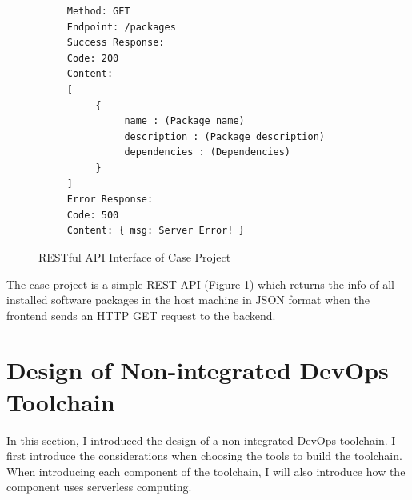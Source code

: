 \begin{figure}[!h]
     \begin{verbatim}
     Method: GET
     Endpoint: /packages
     Success Response:
     Code: 200
     Content:
     [
          {
               name : (Package name)
               description : (Package description)
               dependencies : (Dependencies)
          }
     ]
     Error Response:
     Code: 500
     Content: { msg: Server Error! }
     \end{verbatim}
     \caption{RESTful API Interface of Case Project}
     \label{fig:rest}
     \end{figure}
\par
The case project is a simple REST API (Figure \ref{fig:rest}) which returns the info of all installed software packages in the host machine in JSON format when the frontend sends an HTTP GET request to the backend.
\section{Design of Non-integrated DevOps Toolchain}
In this section, I introduced the design of a non-integrated DevOps toolchain. I first introduce the considerations when choosing the tools to build the toolchain. When introducing each component of the toolchain, I will also introduce how the component uses serverless computing.
